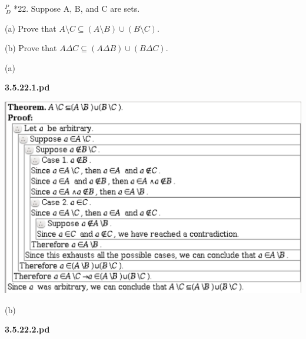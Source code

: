 \documentclass{article}
\begin{document}
\vspace{30pt}

$^{\textit{P}}_{\, \textit{D}}$ *22. Suppose A, B, and C are sets.

\hspace{12pt}(a) Prove that $A \setminus C \subseteq (A \setminus B) \cup (B \setminus C)$.

\hspace{12pt}(b) Prove that $A \Delta C \subseteq (A \Delta B) \cup (B \Delta C)$.

\vspace{30pt}

(a)


\textbf{3.5.22.1.pd}
\vspace{10pt}

\includegraphics[width=\textwidth]{3_5_22_1}

\vspace{30pt}

(b)

\textbf{3.5.22.2.pd}
\vspace{10pt}
\end{document}
